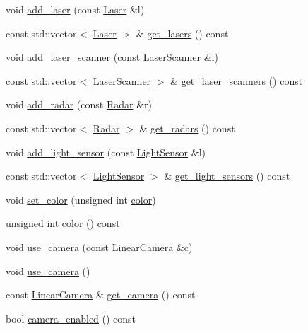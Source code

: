 \begin{DoxyCompactItemize}
\item 
void \hyperlink{classfastsim_1_1_robot_a93935e30685df5ee1908a18359d4f930}{add\+\_\+laser} (const \hyperlink{classfastsim_1_1_laser}{Laser} \&l)
\item 
const std\+::vector$<$ \hyperlink{classfastsim_1_1_laser}{Laser} $>$ \& \hyperlink{classfastsim_1_1_robot_a51eecea5e6f06cbffee28f0e9dd8885e}{get\+\_\+lasers} () const 
\item 
void \hyperlink{classfastsim_1_1_robot_a86829438cca30f2aa5b1b25dc34df0f4}{add\+\_\+laser\+\_\+scanner} (const \hyperlink{classfastsim_1_1_laser_scanner}{Laser\+Scanner} \&l)
\item 
const std\+::vector$<$ \hyperlink{classfastsim_1_1_laser_scanner}{Laser\+Scanner} $>$ \& \hyperlink{classfastsim_1_1_robot_ae230665f6c3aad757b54eabbe3074151}{get\+\_\+laser\+\_\+scanners} () const 
\item 
void \hyperlink{classfastsim_1_1_robot_a6a1883d38470cbc0a79c7a5ba53b9ba7}{add\+\_\+radar} (const \hyperlink{classfastsim_1_1_radar}{Radar} \&r)
\item 
const std\+::vector$<$ \hyperlink{classfastsim_1_1_radar}{Radar} $>$ \& \hyperlink{classfastsim_1_1_robot_a71e40db8585914158a546969122cbb60}{get\+\_\+radars} () const 
\item 
void \hyperlink{classfastsim_1_1_robot_a6351f28c65abc9923829ea9e3b9d8253}{add\+\_\+light\+\_\+sensor} (const \hyperlink{classfastsim_1_1_light_sensor}{Light\+Sensor} \&l)
\item 
const std\+::vector$<$ \hyperlink{classfastsim_1_1_light_sensor}{Light\+Sensor} $>$ \& \hyperlink{classfastsim_1_1_robot_a048ccc075ab4854b30d62736bbaeedba}{get\+\_\+light\+\_\+sensors} () const 
\item 
void \hyperlink{classfastsim_1_1_robot_a15f4187030e934d5f2ab300604209eef}{set\+\_\+color} (unsigned int \hyperlink{classfastsim_1_1_robot_a00a3fdd9976553baedff150b00c055a6}{color})
\item 
unsigned int \hyperlink{classfastsim_1_1_robot_a00a3fdd9976553baedff150b00c055a6}{color} () const 
\item 
void \hyperlink{classfastsim_1_1_robot_a7d50eeef194787227f159f80ac74be51}{use\+\_\+camera} (const \hyperlink{classfastsim_1_1_linear_camera}{Linear\+Camera} \&c)
\item 
void \hyperlink{classfastsim_1_1_robot_ad9e472f1b38ca7d2df39143f401670ed}{use\+\_\+camera} ()
\item 
const \hyperlink{classfastsim_1_1_linear_camera}{Linear\+Camera} \& \hyperlink{classfastsim_1_1_robot_a447b3c5578f92c44b7d50553d2e1c28d}{get\+\_\+camera} () const 
\item 
bool \hyperlink{classfastsim_1_1_robot_ae818be55ce00d24b1bd45b12d2a834d2}{camera\+\_\+enabled} () const 
\end{DoxyCompactItemize}
